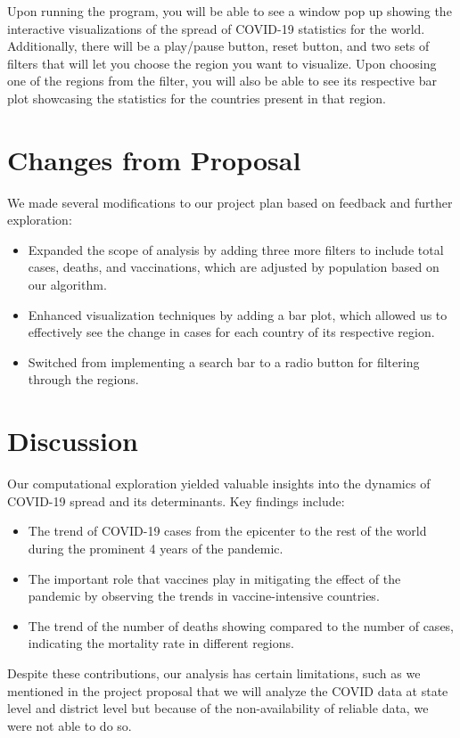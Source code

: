 \documentclass[fontsize=11pt]{article}
\begin{document}
Upon running the program, you will be able to see a window pop up showing the interactive visualizations of the spread of COVID-19 statistics for the world. Additionally, there will be a play/pause button, reset button, and two sets of filters that will let you choose the region you want to visualize. Upon choosing one of the regions from the filter, you will also be able to see its respective bar plot showcasing the statistics for the countries present in that region.

\section{Changes from Proposal}
We made several modifications to our project plan based on feedback and further exploration:

\begin{itemize}
  \item Expanded the scope of analysis by adding three more filters to include total cases, deaths, and vaccinations, which are adjusted by population based on our algorithm.
  \item Enhanced visualization techniques by adding a bar plot, which allowed us to effectively see the change in cases for each country of its respective region.
  \item Switched from implementing a search bar to a radio button for filtering through the regions.
\end{itemize}

\section{Discussion}
Our computational exploration yielded valuable insights into the dynamics of COVID-19 spread and its determinants. Key findings include:

\begin{itemize}
  \item The trend of COVID-19 cases from the epicenter to the rest of the world during the prominent 4 years of the pandemic.
  \item The important role that vaccines play in mitigating the effect of the pandemic by observing the trends in vaccine-intensive countries.
  \item The trend of the number of deaths showing compared to the number of cases, indicating the mortality rate in different regions.
\end{itemize}

Despite these contributions, our analysis has certain limitations, such as we mentioned in the project proposal that we will analyze the COVID data at state level and district level but because of the non-availability of reliable data, we were not able to do so.
\end{document}
